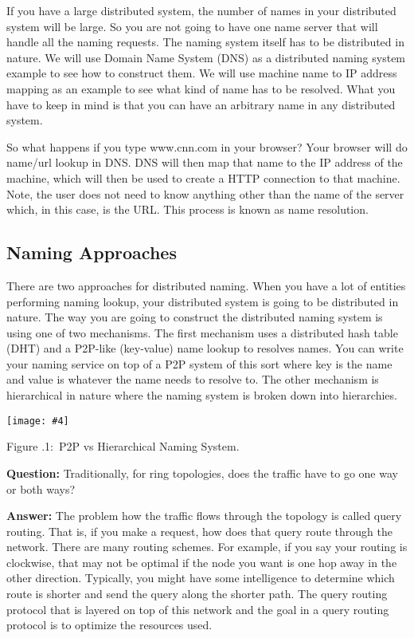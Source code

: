 \documentclass[twoside]{article}
\newcounter{lecnum}
\newcommand{\fig}[4]{
            \centerline{\texttt{[image: \#4]}}
            \begin{center}
            Figure \thelecnum.#1:~#3
            \end{center}
    }
\begin{document}
If you have a large distributed system, the number of names in your distributed system will be large. So you are not going to have one name server that will handle all the naming requests. The naming system itself has to be distributed in nature. We will use Domain Name System (DNS) as a distributed naming system example to see how to construct them. We will use machine name to IP address mapping as an example to see what kind of name has to be resolved. What you have to keep in mind is that you can have an arbitrary name in any distributed system.

So what happens if you type www.cnn.com in your browser? Your browser will do name/url lookup in DNS. DNS will then map that name to the IP address of the machine, which will then be used to create a HTTP connection to that machine. Note, the user does not need to know anything other than the name of the server which, in this case, is the URL. This process is known as name resolution.

\subsection{Naming Approaches}
There are two approaches for distributed naming. When you have a lot of entities performing naming lookup, your distributed system is going to be distributed in nature. The way you are going to construct the distributed naming system is using one of two mechanisms. The first mechanism uses a distributed hash table (DHT) and a P2P-like (key-value) name lookup to resolves names. You can write your naming service on top of a P2P system of this sort where key is the name and value is whatever the name needs to resolve to. The other mechanism is hierarchical in nature where the naming system is broken down into hierarchies. 

 \fig{1}{0.6}{P2P vs Hierarchical Naming System.}{hierarchical_vs_p2p.png}
 
\textbf{Question:} Traditionally, for ring topologies, does the traffic have to go one way or both ways?

\textbf{Answer:} The problem how the traffic flows through the topology is called query routing. That is, if you make a request, how does that query route through the network. There are many routing schemes. For example, if you say your routing is clockwise, that may not be optimal if the node you want is one hop away in the other direction. Typically, you might have some intelligence to determine which route is shorter and send the query along the shorter path. The query routing protocol that is layered on top of this network and the goal in a query routing protocol is to optimize the resources used.
 
\end{document}
